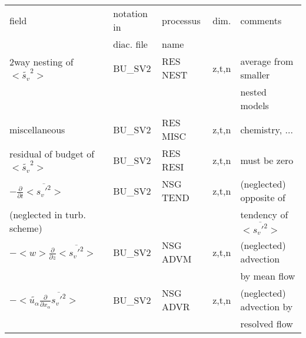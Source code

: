 \begin{center}
\begin{tabular}{||p{5cm}|>{\centering}p{2cm}|>{\centering}p{2.5cm}|>{\centering}p{0.5cm}|p{5.5cm }||}
\hline
\hline
field & notation in & processus & dim.  & comments \\
      & diac. file & name      &            & \\
\hline
\hline
{\rm 2way nesting of }$<\tilde{s_v}^2>$ & BU\_SV2 & RES NEST & z,t,n& average from smaller\\
 & & & &nested models \\
\hline
{\rm miscellaneous} & BU\_SV2 & RES MISC & z,t,n & chemistry, ... \\
\hline
{\rm residual of budget of} $<\tilde{s_v}^2>$ & BU\_SV2 & RES RESI & z,t,n & must be zero \\
\hline
$-\frac{\partial }{\partial t}<\overline{s_v'^2}>$ & BU\_SV2 & NSG TEND & z,t,n & (neglected) opposite of\\
(neglected in turb. scheme) & & & &tendency of $<\overline{s_v'^2}>$ \\
\hline
$-<w>\frac{\partial}{\partial z}<\overline{s_v'^2}>$  & BU\_SV2 & NSG ADVM & z,t,n & (neglected) advection \\
 & & & & by mean flow\\
\hline
$-<\tilde{u_\alpha}\frac{\partial}{\partial x_\alpha}\overline{s_v'^2}>$  & BU\_SV2 & NSG ADVR & z,t,n & (neglected) advection by\\
 & & & &resolved flow\\
\hline
\hline
\end{tabular}
\end{center}

